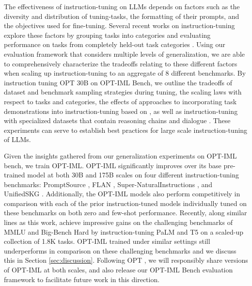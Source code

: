 The effectiveness of instruction-tuning on LLMs depends on factors such as the diversity and distribution of tuning-tasks, the formatting of their prompts, and the objectives used for fine-tuning. Several recent works on instruction-tuning explore these factors by grouping tasks into categories and evaluating performance on tasks from completely held-out task categories \citep{sanh2021t0,wei2021flan,wang2022niv2}. Using our evaluation framework that considers multiple levels of generalization, we are able to comprehensively characterize the tradeoffs relating to these different factors when scaling up instruction-tuning to an aggregate of 8 different benchmarks. By instruction tuning OPT 30B \citep{zhang2022opt} on OPT-IML Bench, we outline the tradeoffs of dataset and benchmark sampling strategies during tuning, the scaling laws with respect to tasks and categories, the effects of approaches to incorporating task demonstrations into instruction-tuning based on \cite{min2021metaicl}, as well as instruction-tuning with specialized datasets that contain reasoning chains \citep{kojima2022large, wei2022cot} and dialogue \citep{shuster2022blenderbot}. These experiments can serve to establish best practices for large scale instruction-tuning of LLMs.

Given the insights gathered from our generalization experiments on OPT-IML bench, we train OPT-IML. OPT-IML significantly improves over its base pre-trained model at both 30B and 175B scales on four different instruction-tuning benchmarks: PromptSource \citep{sanh2021t0}, FLAN \citep{wei2021flan}, Super-NaturalInstructions \citep{wang2022niv2}, and UnifiedSKG \citep{xie2022unifiedskg}. Additionally, the OPT-IML models also perform competitively in comparison with each of the prior instruction-tuned models individually tuned on these benchmarks on both zero and few-shot performance. Recently, along similar lines as this work, \cite{chung2022flanpalm} achieve impressive gains on the challenging benchmarks of MMLU \citep{hendrycks2020measuring} and Big-Bench Hard \citep{suzgun2022challenging} by instruction-tuning PaLM \citep{chowdhery2022palm} and T5 \citep{raffel2020t5} on a scaled-up collection of 1.8K tasks. OPT-IML trained under similar settings still underperforms in comparison on these challenging benchmarks and we discuss this in Section \ref{sec:discussion}. Following OPT \citep{zhang2022opt}, we will responsibly share versions of OPT-IML at both scales, and also release our OPT-IML Bench evaluation framework to facilitate future work in this direction. 


